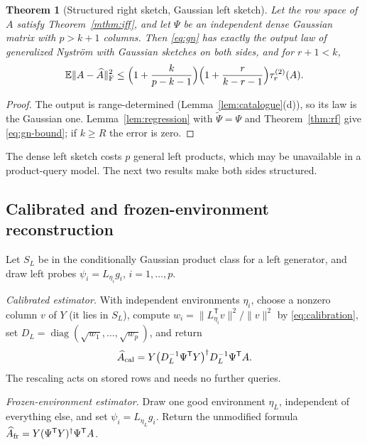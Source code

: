 \documentclass[11pt,a4paper]{article}
\newtheorem{theorem}{Theorem}[section]
\theoremstyle{definition}
\theoremstyle{remark}
\numberwithin{equation}{section}
\newcommand{\E}{\mathbb E}
\newcommand{\T}{{\mathsf T}}
\newcommand{\diag}{\operatorname{diag}}
\newcommand{\norm}[1]{\lVert#1\rVert}
\newcommand{\F}{\mathrm F}
\begin{document}
\begin{theorem}[Structured right sketch, Gaussian left sketch]\label{thm:mixed}
Let the row space of $A$ satisfy Theorem~\ref{mthm:iff}, and let $\Psi$ be an
independent dense Gaussian matrix with $p>k+1$ columns. Then \eqref{eq:gn} has
exactly the output law of generalized Nystr\"om with Gaussian sketches on both
sides, and for $r+1<k$,
\begin{equation}\label{eq:gn-bound}
 \E\norm{A-\widehat A}_\F^2\le\Bigl(1+\frac k{p-k-1}\Bigr)
 \Bigl(1+\frac r{k-r-1}\Bigr)\tau_r^{(2)}(A).
\end{equation}
\end{theorem}

\begin{proof}
The output is range-determined (Lemma~\ref{lem:catalogue}(d)), so its law is
the Gaussian one. Lemma~\ref{lem:regression} with $\widetilde\Psi=\Psi$ and
Theorem~\ref{thm:rf} give \eqref{eq:gn-bound}; if $k\ge R$ the error is zero.
\end{proof}

The dense left sketch costs $p$ general left products, which may be
unavailable in a product-query model. The next two results make both sides
structured.

\subsection{Calibrated and frozen-environment reconstruction}

Let $S_L$ be in the conditionally Gaussian product class for a left generator,
and draw left probes $\psi_i=L_{\eta_i}g_i$, $i=1,\ldots,p$.

\emph{Calibrated estimator.} With independent environments $\eta_i$, choose a
nonzero column $v$ of $Y$ (it lies in $S_L$), compute
$w_i=\norm{L_{\eta_i}^\T v}^2/\norm v^2$ by \eqref{eq:calibration}, set
$D_L=\diag(\sqrt{w_1},\ldots,\sqrt{w_p})$, and return
\begin{equation}\label{eq:calGN}
 \widehat A_{\rm cal}=Y\bigl(D_L^{-1}\Psi^\T Y\bigr)^\dagger D_L^{-1}\Psi^\T A .
\end{equation}
The rescaling acts on stored rows and needs no further queries.

\emph{Frozen-environment estimator.} Draw one good environment $\eta_L$,
independent of everything else, and set $\psi_i=L_{\eta_L}g_i$. Return the
unmodified formula $\widehat A_{\rm fr}=Y(\Psi^\T Y)^\dagger\Psi^\T A$.
\end{document}
